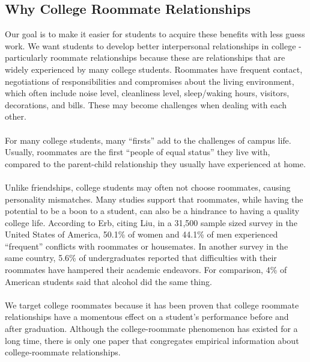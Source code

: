 \documentclass[journal]{./IEEE/IEEEtran}
\begin{document}
    \subsection{Why College Roommate Relationships}
    Our goal is to make it easier for students to acquire these benefits with less guess work. We want students to develop better interpersonal relationships in college - particularly roommate relationships because these are relationships that are widely experienced by many college students\cite{erb}. Roommates have frequent contact, negotiations of responsibilities and compromises about the living environment, which often include noise level, cleanliness level, sleep/waking hours, visitors, decorations, and bills\cite{erb}. These may become challenges when dealing with each other.
    \\
    \\
    \indent For many college students, many ``firsts'' add to the challenges of campus life. Usually, roommates are the first ``people of equal status'' they live with, compared to the parent-child relationship they usually have experienced at home\cite{erb}.
    \\
    \\
    \indent Unlike friendships, college students may often not choose roommates, causing personality mismatches. Many studies support that roommates, while having the potential to be a boon to a student, can also be a hindrance to having a quality college life. According to Erb\cite{erb}, citing Liu\cite{liu}, in a 31,500 sample sized survey in the United States of America, 50.1\% of women and 44.1\% of men experienced “frequent” conflicts with roommates or housemates. In another survey in the same country, 5.6\% of undergraduates reported that difficulties with their roommates have hampered their academic endeavors\cite{erb}. For comparison, 4\% of American students said that alcohol did the same thing\cite{erb}.
    \\
    \\
    \indent We target college roommates because it has been proven that college roommate relationships have a momentous effect on a student's performance before and after graduation. Although the college-roommate phenomenon has existed for a long time, there is only one paper that congregates empirical information about college-roommate relationships\cite{erb}.
\end{document}
